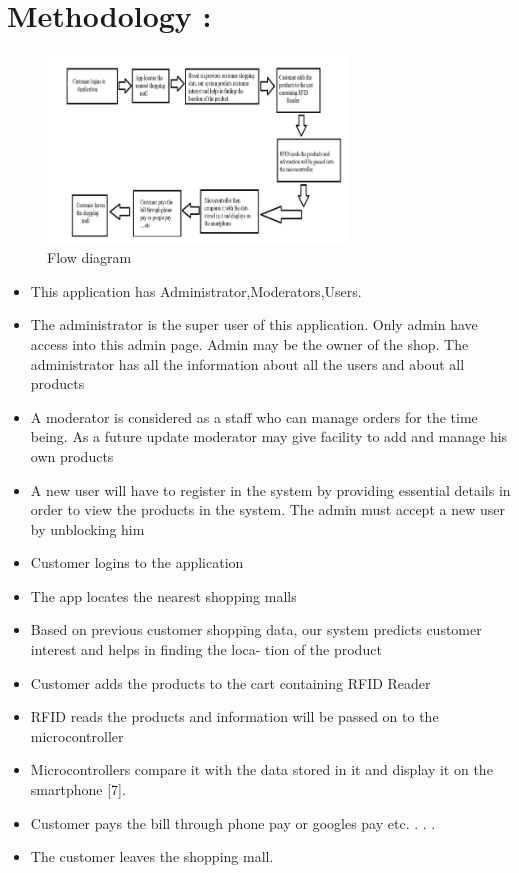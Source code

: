 \documentclass[conference]{IEEEtran}
\begin{document}
\section{Methodology :}
\begin{figure}[htbp]
	\centerline{\includegraphics[width=80mm]{Flow_Digram}}
	\caption{Flow diagram}
	\label{fig}
\end{figure}
\begin{itemize}  
\item This application has Administrator,Moderators,Users.
\item The administrator is the super user of this application. Only admin have access into this admin page. Admin may be the owner of the shop. The administrator has all the information about all the users and about all products
\item A moderator is considered as a staff who can manage orders for the time being. As a future update moderator may give facility to add and manage his own products
\item A new user will have to register in the system by providing essential details in order to view the products in the system. The admin must accept a new user by unblocking him
\item Customer logins to the application
\item The app locates the nearest shopping malls
\item Based on previous customer shopping data, our system predicts customer interest and helps in finding the loca- tion of the product
\item Customer adds the products to the cart containing RFID Reader
\item RFID reads the products and information will be passed on to the microcontroller
\item Microcontrollers compare it  with the data stored in it and display it on the smartphone [7].
\item Customer pays the bill through phone pay or googles pay etc. . . .
\item The customer leaves the shopping mall.

\end{itemize}		
\end{document}
